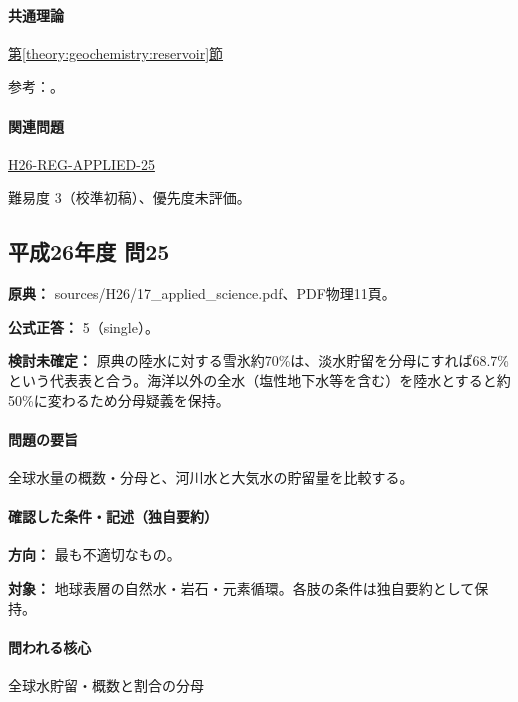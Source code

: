 \paragraph{共通理論} \hyperref[theory:geochemistry:reservoir]{第\ref*{theory:geochemistry:reservoir}節}

\par 参考：\cite{gc_water}。

\paragraph{関連問題} \hyperref[q:h26-reg-applied-25]{H26-REG-APPLIED-25}

\par 難易度 3（校準初稿）、優先度未評価。

\subsection{平成26年度 問25}
\label{q:h26-reg-applied-25}

\noindent\textbf{原典：} sources/H26/17\_applied\_science.pdf、PDF物理11頁。

\textbf{公式正答：} 5（single）。

\par\textbf{検討未確定：} 原典の陸水に対する雪氷約70\%は、淡水貯留を分母にすれば68.7\%という代表表と合う。海洋以外の全水（塩性地下水等を含む）を陸水とすると約50\%に変わるため分母疑義を保持。

\paragraph{問題の要旨} 全球水量の概数・分母と、河川水と大気水の貯留量を比較する。

\paragraph{確認した条件・記述（独自要約）}\mbox{}\par

\noindent\textbf{方向：} 最も不適切なもの。\par

\noindent\textbf{対象：} 地球表層の自然水・岩石・元素循環。各肢の条件は独自要約として保持。\par

\paragraph{問われる核心} 全球水貯留・概数と割合の分母

